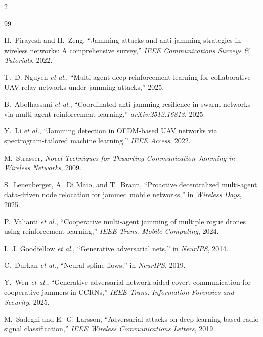 \documentclass[10pt,a4paper]{article}
\begin{document}
{\scriptsize
\begin{multicols}{2}
\begin{thebibliography}{99}
\setlength{\itemsep}{0pt}
\setlength{\parsep}{0pt}

H.~Pirayesh and H.~Zeng, ``Jamming attacks and anti-jamming strategies in wireless networks: A
comprehensive survey,'' \emph{IEEE Communications Surveys \& Tutorials}, 2022.

T.~D. Nguyen \emph{et al.}, ``Multi-agent deep reinforcement learning for collaborative UAV relay
networks under jamming attacks,'' 2025.

B.~Abolhassani \emph{et al.}, ``Coordinated anti-jamming resilience in swarm networks via
multi-agent reinforcement learning,'' \emph{arXiv:2512.16813}, 2025.

Y.~Li \emph{et al.}, ``Jamming detection in OFDM-based UAV networks via spectrogram-tailored
machine learning,'' \emph{IEEE Access}, 2022.

M.~Strasser, \emph{Novel Techniques for Thwarting Communication Jamming in Wireless Networks},
2009.

S.~Leuenberger, A.~Di Maio, and T.~Braun, ``Proactive decentralized multi-agent data-driven node
relocation for jammed mobile networks,'' in \emph{Wireless Days}, 2025.

P.~Valianti \emph{et al.}, ``Cooperative multi-agent jamming of multiple rogue drones using
reinforcement learning,'' \emph{IEEE Trans. Mobile Computing}, 2024.

I.~J. Goodfellow \emph{et al.}, ``Generative adversarial nets,'' in \emph{NeurIPS}, 2014.

C.~Durkan \emph{et al.}, ``Neural spline flows,'' in \emph{NeurIPS}, 2019.

Y.~Wen \emph{et al.}, ``Generative adversarial network-aided covert communication for cooperative
jammers in CCRNs,'' \emph{IEEE Trans. Information Forensics and Security}, 2025.

M.~Sadeghi and E.~G. Larsson, ``Adversarial attacks on deep-learning based radio signal
classification,'' \emph{IEEE Wireless Communications Letters}, 2019.


\end{thebibliography}
\end{multicols}}
\end{document}

